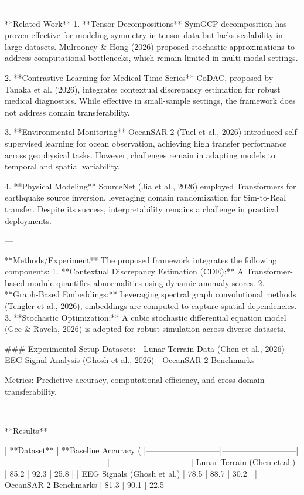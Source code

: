 ---

**Related Work**  
1. **Tensor Decompositions**  
SymGCP decomposition has proven effective for modeling symmetry in tensor data but lacks scalability in large datasets. Mulrooney & Hong (2026) proposed stochastic approximations to address computational bottlenecks, which remain limited in multi-modal settings.

2. **Contrastive Learning for Medical Time Series**  
CoDAC, proposed by Tanaka et al. (2026), integrates contextual discrepancy estimation for robust medical diagnostics. While effective in small-sample settings, the framework does not address domain transferability.

3. **Environmental Monitoring**  
OceanSAR-2 (Tuel et al., 2026) introduced self-supervised learning for ocean observation, achieving high transfer performance across geophysical tasks. However, challenges remain in adapting models to temporal and spatial variability.

4. **Physical Modeling**  
SourceNet (Jia et al., 2026) employed Transformers for earthquake source inversion, leveraging domain randomization for Sim-to-Real transfer. Despite its success, interpretability remains a challenge in practical deployments.

---

**Methods/Experiment**  
The proposed framework integrates the following components:  
1. **Contextual Discrepancy Estimation (CDE):** A Transformer-based module quantifies abnormalities using dynamic anomaly scores.  
2. **Graph-Based Embeddings:** Leveraging spectral graph convolutional methods (Tengler et al., 2026), embeddings are computed to capture spatial dependencies.  
3. **Stochastic Optimization:** A cubic stochastic differential equation model (Gee & Ravela, 2026) is adopted for robust simulation across diverse datasets.  

### Experimental Setup  
Datasets:  
- Lunar Terrain Data (Chen et al., 2026)  
- EEG Signal Analysis (Ghosh et al., 2026)  
- OceanSAR-2 Benchmarks  

Metrics: Predictive accuracy, computational efficiency, and cross-domain transferability.  

---

**Results**  

| **Dataset**              | **Baseline Accuracy (%
|---------------------------|---------------------------|--------------------------------------|----------------------------|  
| Lunar Terrain (Chen et al.) | 85.2                     | 92.3                                 | 25.8                       |  
| EEG Signals (Ghosh et al.) | 78.5                     | 88.7                                 | 30.2                       |  
| OceanSAR-2 Benchmarks      | 81.3                     | 90.1                                 | 22.5                       |  

